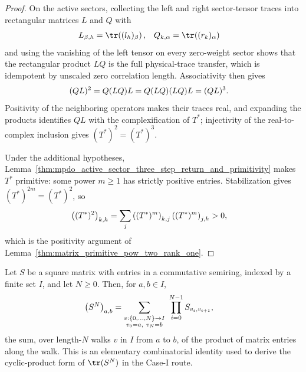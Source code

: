 \begin{proof}
    \leanok
    On the active sectors, collecting the left and right sector-tensor
    traces into rectangular matrices $L$ and $Q$ with
    \begin{align}
        L_{\beta,h}  & =\tr\!\left((l_h)_\beta\right),
                     &
        Q_{k,\alpha} & =\tr\!\left((r_k)_\alpha\right)
        \notag
    \end{align}
    and using the vanishing of the left tensor on every zero-weight sector
    shows that the rectangular product $LQ$ is the full physical-trace
    transfer, which is idempotent by unscaled zero correlation length.
    Associativity then gives
    \begin{align}
        (QL)^2 & =Q(LQ)L=Q(LQ)(LQ)L=(QL)^3.
        \notag
    \end{align}
    Positivity of the neighboring operators makes their traces real,
    and expanding the products identifies $QL$ with the
    complexification of $T^*$; injectivity of the real-to-complex
    inclusion gives $(T^*)^2=(T^*)^3$.

    Under the additional hypotheses,
    Lemma~\ref{thm:mpdo_active_sector_three_step_return_and_primitivity}
    makes $T^*$ primitive: some power $m\geq1$ has strictly positive
    entries. Stabilization gives $(T^*)^{2m}=(T^*)^2$, so
    \begin{align}
        \left((T^*)^2\right)_{k,h}
         & =\sum_j\left((T^*)^m\right)_{k,j}
        \left((T^*)^m\right)_{j,h}>0,
        \notag
    \end{align}
    which is the positivity argument of
    Lemma~\ref{thm:matrix_primitive_pow_two_rank_one}.
\end{proof}

\begin{lemma}
    \label{lem:mpdo_pow_apply_path_indicator}
    \leanok
    Let $S$ be a square matrix with entries in a commutative semiring,
    indexed by a finite set $I$, and let $N\geq0$. Then, for $a,b\in I$,
    \begin{align}
        \left(S^N\right)_{a,b}
         & =\sum_{\substack{v:\{0,\ldots,N\}\to I \\ v_0=a,\ v_N=b}}
        \ \prod_{i=0}^{N-1}S_{v_i,v_{i+1}},
        \notag
    \end{align}
    the sum, over length-$N$ walks $v$ in $I$ from $a$ to $b$, of the
    product of matrix entries along the walk. This is an elementary
    combinatorial identity used to derive the cyclic-product form of
    $\tr(S^N)$ in the Case-I route.
\end{lemma}

